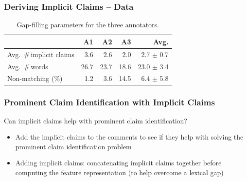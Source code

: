 \documentclass{beamer}
\begin{document}
\begin{frame}
	\frametitle{Deriving Implicit Claims -- Data}
\begin{table}[t]
{\small
\begin{center}
\begin{tabular}{lrrrr}
\toprule
& A1 & A2 & A3 & Avg.\\
\midrule
Avg.~\#\,implicit claims  & 3.6  & 2.6   & 2.0   &  \phantom{0}2.7 $\pm$ 0.7  \\
Avg.~\#\,words     & 26.7 & 23.7  & 18.6  &  23.0 $\pm$ 3.4      \\
Non-matching (\%)     & 1.2  & 3.6   & 14.5  &  \phantom{0}6.4 $\pm$ 5.8  \\
\bottomrule
\end{tabular}
\caption{Gap-filling parameters for the three annotators.}
\label{tab:var-annotators}
\end{center}}
\end{table}

\end{frame}

\begin{frame}
	\frametitle{Prominent Claim Identification with Implicit Claims}

	Can implicit claims help with prominent claim identification?
	\begin{itemize}
		\item Add the implicit claims to the comments to see if they help
			with solving the prominent claim identification problem

		\item Adding implicit claims: concatenating implicit claims
			together before computing the feature representation
			(to help overcome a lexical gap)
	\end{itemize}

\end{frame}
\end{document}
